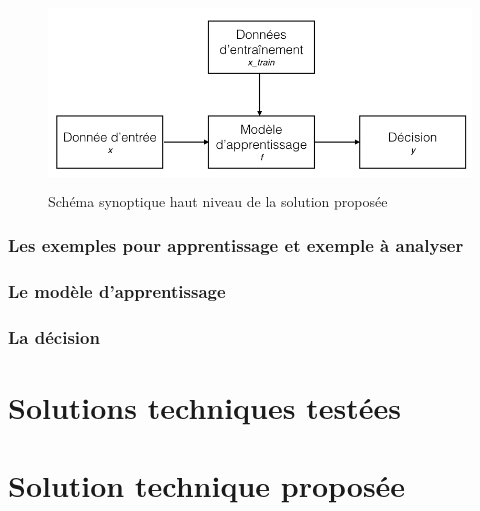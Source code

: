 \begin{figure}[h]
	\centering\includegraphics[height=5cm]{images/ML_high_level.jpeg}
	\caption{Schéma synoptique haut niveau de la solution proposée}
	\label{fig:Schéma synoptique haut niveau de la solution proposée}
\end{figure}

\subsubsection{Les exemples pour apprentissage et exemple à analyser}
\label{Automatisation du processus d'investigation: Achitecture High Level du système proposé: Les exemples d'apprentissage}

\subsubsection{Le modèle d'apprentissage}
\label{Automatisation du processus d'investigation: Achitecture High Level du système proposé: Le modèle d'apprentissage}

\subsubsection{La décision}
\label{Automatisation du processus d'investigation: Achitecture High Level du système proposé: La décision}



\section{Solutions techniques testées}
\label{Automatisation du processus d'investigation: Solutions techniques testées}




\section{Solution technique proposée}
\label{Automatisation du processus d'investigation: Solution technique proposée}

